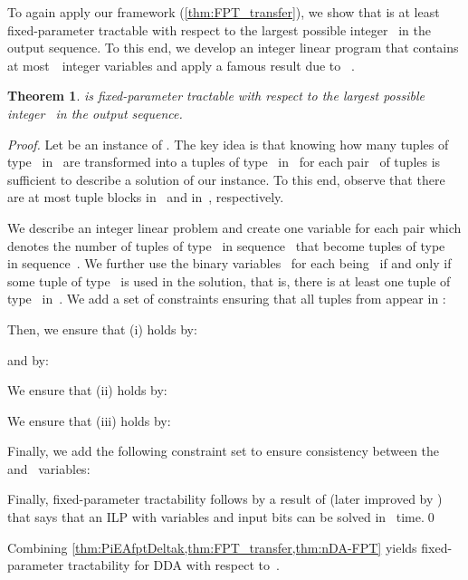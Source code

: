 \documentclass[a4paper,11pt]{article}
\theoremstyle{remark}
\theoremstyle{plain}
\newtheorem{theorem}{Theorem}
\newtheorem{corollary}[theorem]{Corollary}
\theoremstyle{definition}
\newcommand{\DA}{\textsc{DDA}\xspace}
\begin{document}
To again apply our framework (\cref{thm:FPT_transfer}), we show that \nDA is at least fixed-parameter tractable with respect to the largest possible integer~ in the output sequence.
To this end, we develop an integer linear program that contains at most~~integer
variables and apply a famous result due to \citeauthor{Len83}~\cite{Len83}. 

\begin{theorem}\label{thm:nDA-FPT}
	\nDA is fixed-parameter tractable with respect to the largest possible integer~ in the output sequence.
\end{theorem}

\begin{proof}
 Let  be an instance of \nDA.
 The key idea is that knowing how many tuples of type~ in~ are
 transformed into a tuples of type~ in~ for each pair~ of tuples
 is sufficient to describe a solution of our \nDA instance.
 To this end, observe that there are at most  tuple blocks
 in~ and in~, respectively.
 
 We describe an integer linear problem and create one variable  for each
 pair  which denotes the number of tuples
 of type~ in sequence~ that become tuples of type~ in sequence~.
 We further use the binary variables~ for each  being~ if and only if some tuple of type~ is used in the solution, that is,
 there is at least one tuple of type~ in~.
 We add a set of constraints ensuring that all tuples from  appear in :
 
 Then, we ensure that (i) holds by:
  
 and by:
 
 We ensure that (ii) holds by:
 
 We ensure that (iii) holds by:
 
 Finally, we add the following constraint set to ensure consistency between the~ and ~variables:\
 

 Finally, fixed-parameter tractability follows by
 a result of \citet{Len83}
(later improved by \citet{Kan87,FT87b})
 that says that an ILP with  variables and  input bits can be solved
 in~ time.\qed
\end{proof}

Combining \cref{thm:PiEAfptDeltak,thm:FPT_transfer,thm:nDA-FPT} yields fixed-parameter tractability for \DA with respect to~.

\end{document}
